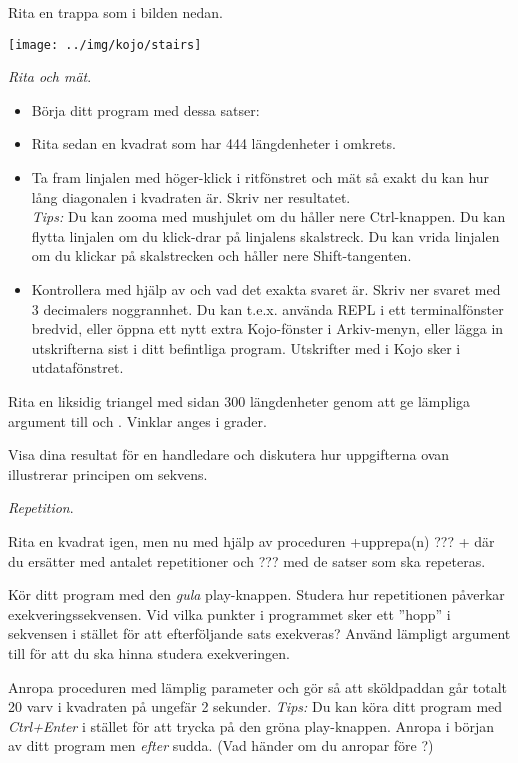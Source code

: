 \Subtask Rita en trappa som i bilden nedan.

\texttt{[image: ../img/kojo/stairs]}

\Subtask \emph{Rita och mät}.
\begin{itemize}[noitemsep]
\item Börja ditt program med dessa satser:\\ 
\item Rita sedan en kvadrat som har 444 längdenheter i omkrets.
\item Ta fram linjalen med höger-klick i ritfönstret och mät så exakt du kan hur lång diagonalen i kvadraten är. Skriv ner resultatet. \\ \emph{Tips:} Du kan zooma med mushjulet om du håller nere Ctrl-knappen. Du kan flytta linjalen om du klick-drar på linjalens skalstreck. Du kan vrida linjalen om du klickar på skalstrecken och håller nere Shift-tangenten.
\item Kontrollera med hjälp av  och  vad det exakta svaret är. Skriv ner svaret med 3 decimalers noggrannhet. Du kan t.e.x. använda REPL i ett terminalfönster bredvid, eller öppna ett nytt extra Kojo-fönster i Arkiv-menyn, eller lägga in utskrifterna sist i ditt befintliga program. Utskrifter med  i Kojo sker i utdatafönstret. 
\end{itemize}

\Subtask Rita en liksidig triangel med sidan 300 längdenheter genom att ge lämpliga argument till  och . Vinklar anges i grader.

\Subtask\Checkpoint Visa dina resultat för en handledare och diskutera hur uppgifterna ovan illustrerar principen om sekvens.

\Task \textit{Repetition}.

\Subtask Rita en kvadrat igen, men nu med hjälp av proceduren \code+upprepa(n){ ??? }+ där du ersätter  med antalet repetitioner och ??? med de satser som ska repeteras.

\Subtask Kör ditt program med den \emph{gula} play-knappen. Studera hur repetitionen påverkar exekveringssekvensen. Vid vilka punkter i programmet sker ett ''hopp'' i sekvensen i stället för att efterföljande sats exekveras? Använd lämpligt argument till  för att du ska hinna studera exekveringen.

\Subtask Anropa proceduren  med lämplig parameter och gör så att sköldpaddan går totalt 20 varv i kvadraten på ungefär 2 sekunder. \emph{Tips:} Du kan köra ditt program med \emph{Ctrl+Enter} i stället för att trycka på den gröna play-knappen. Anropa  i början av ditt program men \emph{efter} sudda. (Vad händer om du anropar  före ?)


